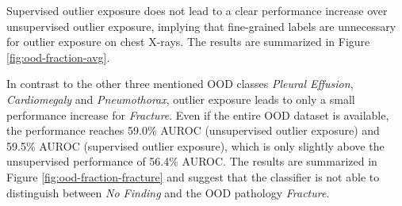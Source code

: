 Supervised outlier exposure does not lead to a clear performance increase over unsupervised outlier exposure, implying that fine-grained labels are unnecessary for outlier exposure on chest X-rays.
The results are summarized in Figure \ref{fig:ood-fraction-avg}.
\par
In contrast to the other three mentioned OOD classes \textit{Pleural Effusion}, \textit{Cardiomegaly} and \textit{Pneumothorax}, outlier exposure leads to only a small performance increase for \textit{Fracture}.
Even if the entire OOD dataset is available, the performance reaches 59.0\% AUROC (unsupervised outlier exposure) and 59.5\% AUROC (supervised outlier exposure), which is only slightly above the unsupervised performance of 56.4\% AUROC.
The results are summarized in Figure \ref{fig:ood-fraction-fracture} and suggest that the classifier is not able to distinguish between \textit{No Finding} and the OOD pathology \textit{Fracture}.